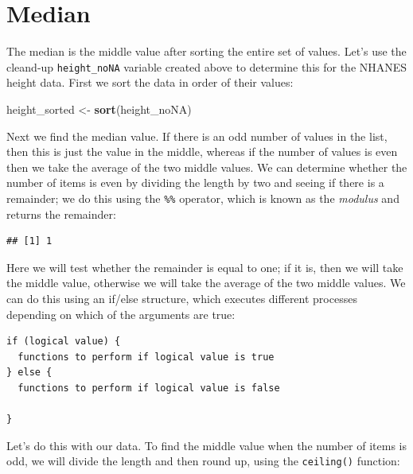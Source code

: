 \documentclass[12pt,]{book}
\newenvironment{Shaded}{\begin{snugshade}}{\end{snugshade}}
\newcommand{\DecValTok}[1]{\textcolor[rgb]{0.00,0.00,0.81}{#1}}
\newcommand{\KeywordTok}[1]{\textcolor[rgb]{0.13,0.29,0.53}{\textbf{#1}}}
\newcommand{\NormalTok}[1]{#1}
\newcommand{\OperatorTok}[1]{\textcolor[rgb]{0.81,0.36,0.00}{\textbf{#1}}}
\newcommand{\StringTok}[1]{\textcolor[rgb]{0.31,0.60,0.02}{#1}}
\begin{document}
\hypertarget{median}{%
\section{Median}\label{median}}

The median is the middle value after sorting the entire set of values. Let's use the cleand-up \texttt{height\_noNA} variable created above to determine this for the NHANES height data. First we sort the data in order of their values:

\begin{Shaded}
\begin{Highlighting}[]
\NormalTok{height_sorted <-}\StringTok{ }\KeywordTok{sort}\NormalTok{(height_noNA)}
\end{Highlighting}
\end{Shaded}

Next we find the median value. If there is an odd number of values in the list, then this is just the value in the middle, whereas if the number of values is even then we take the average of the two middle values. We can determine whether the number of items is even by dividing the length by two and seeing if there is a remainder; we do this using the \texttt{\%\%} operator, which is known as the \emph{modulus} and returns the remainder:

\begin{Shaded}
\end{Shaded}

\begin{verbatim}
## [1] 1
\end{verbatim}

Here we will test whether the remainder is equal to one; if it is, then we will take the middle value, otherwise we will take the average of the two middle values. We can do this using an if/else structure, which executes different processes depending on which of the arguments are true:

\begin{verbatim}
if (logical value) {
  functions to perform if logical value is true
} else {
  functions to perform if logical value is false

}
\end{verbatim}

Let's do this with our data. To find the middle value when the number of items is odd, we will divide the length and then round up, using the \texttt{ceiling()} function:
\end{document}
